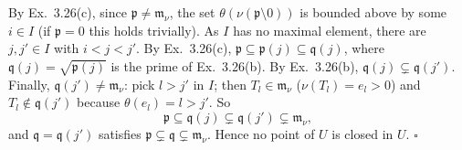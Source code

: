 \documentclass[11pt]{article}
\begin{document}
By Ex.~3.26(c), since $\mathfrak p\neq\mathfrak m_\nu$, the set $\theta(\nu(\mathfrak p\setminus0))$ is bounded above by some $i\in I$ (if $\mathfrak p=0$ this holds trivially). As $I$ has no maximal element, there are $j,j'\in I$ with $i<j<j'$. By Ex.~3.26(c), $\mathfrak p\subseteq\mathfrak p(j)\subseteq\mathfrak q(j)$, where $\mathfrak q(j)=\sqrt{\mathfrak p(j)}$ is the prime of Ex.~3.26(b). By Ex.~3.26(b), $\mathfrak q(j)\subsetneq\mathfrak q(j')$. Finally, $\mathfrak q(j')\neq\mathfrak m_\nu$: pick $l>j'$ in $I$; then $T_l\in\mathfrak m_\nu$ ($\nu(T_l)=e_l>0$) and $T_l\notin\mathfrak q(j')$ because $\theta(e_l)=l>j'$. So
\[ \mathfrak p\subseteq\mathfrak q(j)\subsetneq\mathfrak q(j')\subsetneq\mathfrak m_\nu, \]
and $\mathfrak q=\mathfrak q(j')$ satisfies $\mathfrak p\subsetneq\mathfrak q\subsetneq\mathfrak m_\nu$. Hence no point of $U$ is closed in $U$. \hfill$\square$
\end{document}
